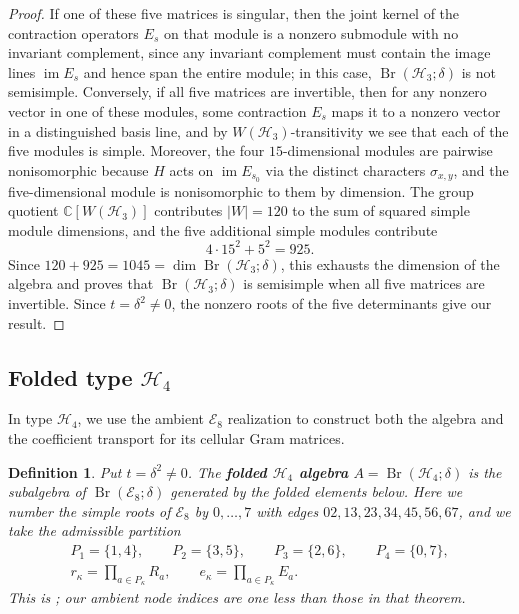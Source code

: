 \documentclass[11pt,a4paper]{amsart}
\newcommand{\Br}{\operatorname{Br}}\newcommand{\Irr}{\operatorname{Irr}}
\theoremstyle{uprightdefinition}
\newtheorem{definition}[theorem]{Definition}
\theoremstyle{remark}\newtheorem{remark}[theorem]{Remark}
\begin{document}
\begin{proof}
If one of these five matrices is singular, then the joint kernel of the contraction operators $E_s$ on that module
is a nonzero submodule with no invariant complement, since any invariant complement must contain the image lines $\operatorname{im}E_s$ and hence span
the entire module; in this case, $\Br(\mathscr{H}_3;\delta)$ is not semisimple.
Conversely, if all five matrices are invertible, then for any nonzero vector in one of these modules, some contraction $E_s$ maps it to a nonzero vector in a distinguished basis line, and by $W(\mathscr{H}_3)$-transitivity we see that each of the five modules is simple. Moreover, the four $15$-dimensional modules are pairwise nonisomorphic
because $H$ acts on $\operatorname{im}E_{s_0}$ via the distinct
characters $\sigma_{x,y}$, and the five-dimensional module is nonisomorphic to them
by dimension. The group quotient $\mathbb C[W(\mathscr{H}_3)]$ contributes
$|W|=120$ to the sum of squared simple module dimensions, and the five additional simple modules contribute
\[
 4\cdot15^2+5^2=925.
\]
Since $120+925=1045=\dim\Br(\mathscr{H}_3;\delta)$, this exhausts the dimension of the algebra and proves that $\Br(\mathscr{H}_3;\delta)$ is
semisimple when all five matrices are invertible. Since $t=\delta^2\ne0$, the nonzero roots of the five determinants give our result.
\end{proof}
\subsection{Folded type \texorpdfstring{$\mathscr{H}_4$}{H4}}
\label{subsec:type-H4}
\label{subsec:H4-status}

In type $\mathscr{H}_4$, we use the ambient $\mathscr{E}_8$ realization to construct both the algebra
and the coefficient transport for its cellular Gram matrices.

\begin{definition}\label{def:h4-model}
Put $t=\delta^2\ne0$. The \textbf{folded $\mathscr{H}_4$ algebra}
$A=\operatorname{Br}(\mathscr{H}_4;\delta)$ is the subalgebra of
$\operatorname{Br}(\mathscr{E}_8;\delta)$ generated by the folded elements below.
Here we number the simple roots of $\mathscr{E}_8$ by $0,\ldots,7$ with edges
$02,13,23,34,45,56,67$, and we take the admissible partition
\[
\begin{gathered}
 P_1=\{1,4\},\qquad P_2=\{3,5\},\qquad
 P_3=\{2,6\},\qquad P_4=\{0,7\},\\
 r_{\kappa}=\prod_{a\in P_{\kappa}}R_a,\qquad
 e_{\kappa}=\prod_{a\in P_{\kappa}}E_a.
\end{gathered}
\]
This is \cite[Theorem~1.2]{Liu2016}; our ambient node indices are
one less than those in that theorem.
\end{definition}
\end{document}
